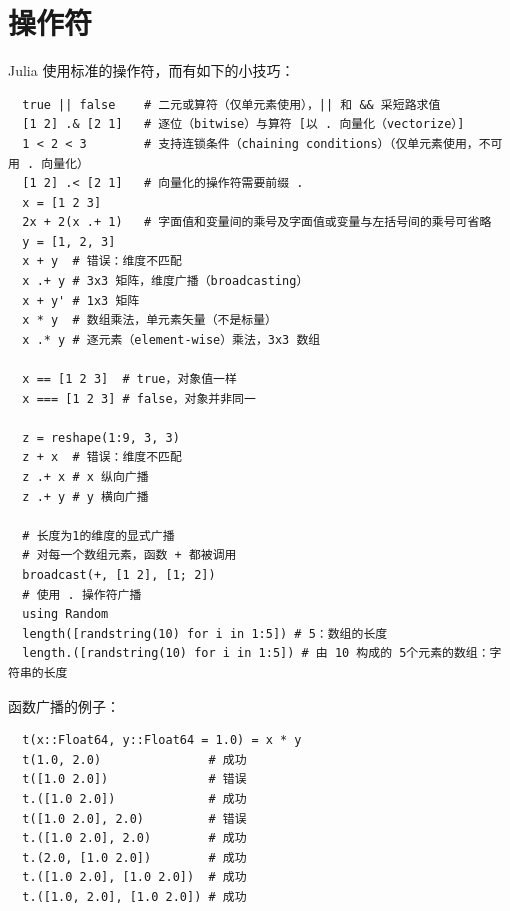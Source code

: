\documentclass[10pt,a4paper]{article}
\begin{document}
\section{操作符}
Julia 使用标准的操作符，而有如下的小技巧：
\begin{lstlisting}
  true || false    # 二元或算符（仅单元素使用），|| 和 && 采短路求值
  [1 2] .& [2 1]   # 逐位（bitwise）与算符 [以 . 向量化（vectorize）]
  1 < 2 < 3        # 支持连锁条件（chaining conditions）（仅单元素使用，不可用 . 向量化）
  [1 2] .< [2 1]   # 向量化的操作符需要前缀 .
  x = [1 2 3]
  2x + 2(x .+ 1)   # 字面值和变量间的乘号及字面值或变量与左括号间的乘号可省略
  y = [1, 2, 3]
  x + y  # 错误：维度不匹配
  x .+ y # 3x3 矩阵，维度广播（broadcasting）
  x + y' # 1x3 矩阵
  x * y  # 数组乘法，单元素矢量（不是标量）
  x .* y # 逐元素（element-wise）乘法，3x3 数组

  x == [1 2 3]  # true，对象值一样
  x === [1 2 3] # false，对象并非同一

  z = reshape(1:9, 3, 3)
  z + x  # 错误：维度不匹配
  z .+ x # x 纵向广播
  z .+ y # y 横向广播

  # 长度为1的维度的显式广播
  # 对每一个数组元素，函数 + 都被调用
  broadcast(+, [1 2], [1; 2])
  # 使用 . 操作符广播
  using Random
  length([randstring(10) for i in 1:5]) # 5：数组的长度
  length.([randstring(10) for i in 1:5]) # 由 10 构成的 5个元素的数组：字符串的长度
\end{lstlisting}

函数广播的例子：
\begin{lstlisting}
  t(x::Float64, y::Float64 = 1.0) = x * y
  t(1.0, 2.0)               # 成功
  t([1.0 2.0])              # 错误
  t.([1.0 2.0])             # 成功
  t([1.0 2.0], 2.0)         # 错误
  t.([1.0 2.0], 2.0)        # 成功
  t.(2.0, [1.0 2.0])        # 成功
  t.([1.0 2.0], [1.0 2.0])  # 成功
  t.([1.0, 2.0], [1.0 2.0]) # 成功
\end{lstlisting}
\end{document}
